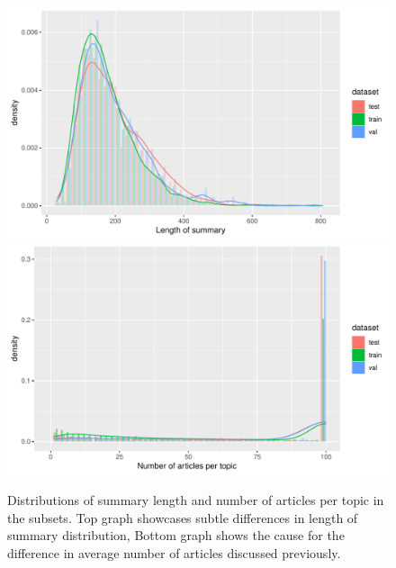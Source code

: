 \documentclass[../main.tex]{subfiles}
\begin{document}
\begin{figure}
    \includegraphics[width=\textwidth]{figures/Rplot01.pdf}
    \includegraphics[width=\textwidth]{figures/Rplot02.pdf}
    \caption{Distributions of summary length and number of articles per topic in the subsets. Top graph showcases subtle differences in length of summary distribution, Bottom graph shows the cause for the difference in average number of articles discussed previously.} \label{fig:analysis-distribution}
\end{figure}
\end{document}
